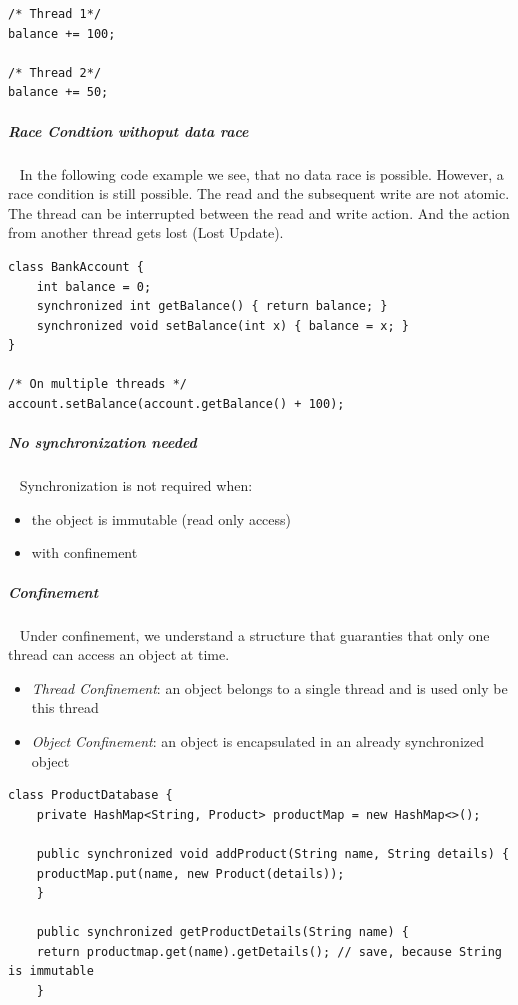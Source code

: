 \documentclass[11pt,twoside,landscape]{article}
\begin{document}
\begin{multicols}{3}
\lstset{language=java,label= ,caption= ,captionpos=b,numbers=none}
\begin{lstlisting}
/* Thread 1*/
balance += 100;

/* Thread 2*/
balance += 50;
\end{lstlisting}
\subparagraph{Race Condtion withoput data race} \
\label{sec:org651eae2}
In the following code example we see, that no data race is possible.
However, a race condition is still possible.
The read and the subsequent write are not atomic.
The thread can be interrupted between the read and write action.
And the action from another thread gets lost (Lost Update).

\lstset{language=java,label= ,caption= ,captionpos=b,numbers=none}
\begin{lstlisting}
class BankAccount {
    int balance = 0;
    synchronized int getBalance() { return balance; }
    synchronized void setBalance(int x) { balance = x; }
}

/* On multiple threads */
account.setBalance(account.getBalance() + 100);
\end{lstlisting}
\subparagraph{No synchronization needed} \
\label{sec:org18bbf7e}
Synchronization is not required when:
\begin{itemize}
\item the object is immutable (read only access)
\item with confinement
\end{itemize}

\subparagraph{Confinement} \
\label{sec:org01540b4}
Under confinement, we understand a structure that guaranties that only one thread can access an object at time.
\begin{itemize}
\item \emph{Thread Confinement}: an object belongs to a single thread and is used only be this thread
\item \emph{Object Confinement}: an object is encapsulated in an already synchronized object
\end{itemize}


\lstset{language=java,label= ,caption= ,captionpos=b,numbers=none}
\begin{lstlisting}
class ProductDatabase {
    private HashMap<String, Product> productMap = new HashMap<>();

    public synchronized void addProduct(String name, String details) {
	productMap.put(name, new Product(details));
    }

    public synchronized getProductDetails(String name) {
	return productmap.get(name).getDetails(); // save, because String is immutable
    }


\end{lstlisting}
\end{multicols}
\end{document}
